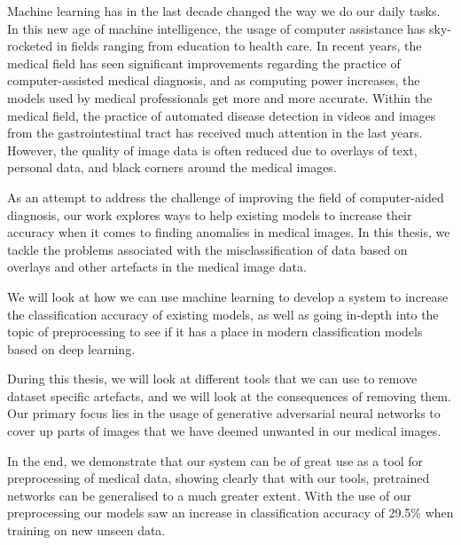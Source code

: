 Machine learning has in the last decade changed the way we do our daily tasks. In this new age of machine intelligence, the usage of computer assistance has sky-rocketed in fields ranging from education to health care.
In recent years, the medical field has seen significant improvements regarding the practice of computer-assisted medical diagnosis, and as computing power increases, the models used by medical professionals get more and more accurate.
Within the medical field, the practice of automated disease detection in videos and images from the gastrointestinal tract has received much attention in the last years. However, the quality of image data is often reduced due to overlays of text, personal data, and black corners around the medical images. 

As an attempt to address the challenge of improving the field of computer-aided diagnosis, our work explores ways to help existing models to increase their accuracy when it comes to finding anomalies in medical images.
In this thesis, we tackle the problems associated with the misclassification of data based on overlays and other artefacts in the medical image data.

We will look at how we can use machine learning to develop a system to increase the classification accuracy of existing models, as well as going in-depth into the topic of preprocessing to see if it has a place in modern classification models based on deep learning. 

During this thesis, we will look at different tools that we can use to remove dataset specific artefacts, and we will look at the consequences of removing them.
Our primary focus lies in the usage of generative adversarial neural networks to cover up parts of images that we have deemed unwanted in our medical images.

In the end, we demonstrate that our system can be of great use as a tool for preprocessing of medical data, showing clearly that with our tools, pretrained networks can be generalised to a much greater extent. With the use of our preprocessing our models saw an increase in classification accuracy of 29.5\% when training on new unseen data.




